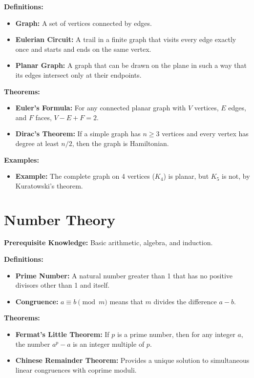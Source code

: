 \textbf{Definitions:}
\begin{itemize}
    \item \textbf{Graph:} A set of vertices connected by edges.
    \item \textbf{Eulerian Circuit:} A trail in a finite graph that visits every edge exactly once and starts and ends on the same vertex.
    \item \textbf{Planar Graph:} A graph that can be drawn on the plane in such a way that its edges intersect only at their endpoints.
\end{itemize}

\textbf{Theorems:}
\begin{itemize}
    \item \textbf{Euler's Formula:} For any connected planar graph with $V$ vertices, $E$ edges, and $F$ faces, $V - E + F = 2$.
    \item \textbf{Dirac's Theorem:} If a simple graph has $n \ge 3$ vertices and every vertex has degree at least $n/2$, then the graph is Hamiltonian.
\end{itemize}

\textbf{Examples:}
\begin{itemize}
    \item \textbf{Example:} The complete graph on 4 vertices ($K_4$) is planar, but $K_5$ is not, by Kuratowski's theorem.
\end{itemize}


\section{Number Theory}
\textbf{Prerequisite Knowledge:} Basic arithmetic, algebra, and induction.

\textbf{Definitions:}
\begin{itemize}
    \item \textbf{Prime Number:} A natural number greater than 1 that has no positive divisors other than 1 and itself.
    \item \textbf{Congruence:} $a \equiv b \pmod m$ means that $m$ divides the difference $a - b$.
\end{itemize}

\textbf{Theorems:}
\begin{itemize}
    \item \textbf{Fermat's Little Theorem:} If $p$ is a prime number, then for any integer $a$, the number $a^p - a$ is an integer multiple of $p$.
    \item \textbf{Chinese Remainder Theorem:} Provides a unique solution to simultaneous linear congruences with coprime moduli.
\end{itemize}

